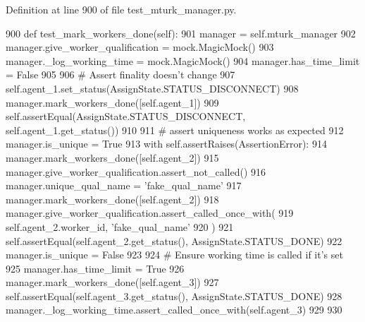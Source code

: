 Definition at line 900 of file test\+\_\+mturk\+\_\+manager.\+py.


\begin{DoxyCode}
900     \textcolor{keyword}{def }test\_mark\_workers\_done(self):
901         manager = self.mturk\_manager
902         manager.give\_worker\_qualification = mock.MagicMock()
903         manager.\_log\_working\_time = mock.MagicMock()
904         manager.has\_time\_limit = \textcolor{keyword}{False}
905 
906         \textcolor{comment}{# Assert finality doesn't change}
907         self.agent\_1.set\_status(AssignState.STATUS\_DISCONNECT)
908         manager.mark\_workers\_done([self.agent\_1])
909         self.assertEqual(AssignState.STATUS\_DISCONNECT, self.agent\_1.get\_status())
910 
911         \textcolor{comment}{# assert uniqueness works as expected}
912         manager.is\_unique = \textcolor{keyword}{True}
913         with self.assertRaises(AssertionError):
914             manager.mark\_workers\_done([self.agent\_2])
915         manager.give\_worker\_qualification.assert\_not\_called()
916         manager.unique\_qual\_name = \textcolor{stringliteral}{'fake\_qual\_name'}
917         manager.mark\_workers\_done([self.agent\_2])
918         manager.give\_worker\_qualification.assert\_called\_once\_with(
919             self.agent\_2.worker\_id, \textcolor{stringliteral}{'fake\_qual\_name'}
920         )
921         self.assertEqual(self.agent\_2.get\_status(), AssignState.STATUS\_DONE)
922         manager.is\_unique = \textcolor{keyword}{False}
923 
924         \textcolor{comment}{# Ensure working time is called if it's set}
925         manager.has\_time\_limit = \textcolor{keyword}{True}
926         manager.mark\_workers\_done([self.agent\_3])
927         self.assertEqual(self.agent\_3.get\_status(), AssignState.STATUS\_DONE)
928         manager.\_log\_working\_time.assert\_called\_once\_with(self.agent\_3)
929 
930 
\end{DoxyCode}
\mbox{\label{classparlai_1_1mturk_1_1core_1_1legacy__2018_1_1test_1_1test__mturk__manager_1_1TestMTurkManagerUnitFunctions_acd20bec59c702e03d28c4351b43b6652}} 
